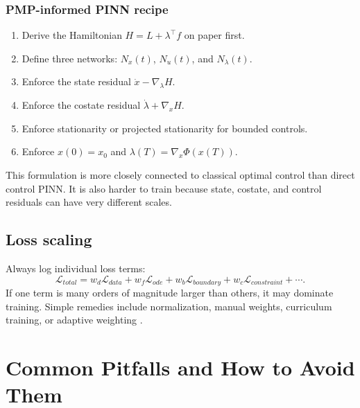 \documentclass[11pt,a4paper]{article}
\begin{document}
\subsubsection*{PMP-informed PINN recipe}
\begin{enumerate}[leftmargin=2em]
    \item Derive the Hamiltonian $H=L+\lambda^\top f$ on paper first.
    \item Define three networks: $N_x(t)$, $N_u(t)$, and $N_\lambda(t)$.
    \item Enforce the state residual $\dot{x}-\nabla_\lambda H$.
    \item Enforce the costate residual $\dot{\lambda}+\nabla_x H$.
    \item Enforce stationarity or projected stationarity for bounded controls.
    \item Enforce $x(0)=x_0$ and $\lambda(T)=\nabla_x\Phi(x(T))$.
\end{enumerate}
This formulation is more closely connected to classical optimal control than direct control PINN. It is also harder to train because state, costate, and control residuals can have very different scales.


\subsection{Loss scaling}
Always log individual loss terms:
\begin{equation}
    \mathcal{L}_{total}=w_d\mathcal{L}_{data}+w_f\mathcal{L}_{ode}+w_b\mathcal{L}_{boundary}+w_c\mathcal{L}_{constraint}+\cdots.
\end{equation}
If one term is many orders of magnitude larger than others, it may dominate training. Simple remedies include normalization, manual weights, curriculum training, or adaptive weighting \cite{wang2021lossimbalance}.

\section{Common Pitfalls and How to Avoid Them}
\end{document}
